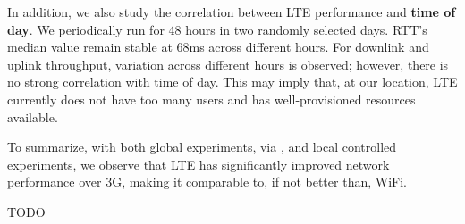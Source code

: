 
In addition, we also study the correlation between LTE performance and \textbf{time of day}. We periodically run \mobiperf for 48 hours in two randomly selected days. RTT's median value remain stable at 68ms across different hours. 
For downlink and uplink throughput, variation across different hours is observed; however, there is no strong correlation with time of day. This may imply that, at our location, LTE currently does not have too many users and has well-provisioned resources available. 

To summarize, with both global experiments, via \mobiperf, and local controlled experiments, we observe that LTE has significantly improved network performance over 3G, making it comparable to, if not better than, WiFi.



TODO


